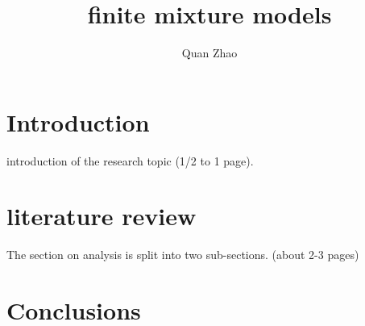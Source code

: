 \documentclass{article}
\begin{document}
\title{finite mixture models}

\author{Quan Zhao}

\maketitle



\section{Introduction}
introduction of the research topic
(1/2 to 1 page).

\section{literature review}
The section on analysis is split into two sub-sections. 
(about 2-3 pages)
\cite{mrc_paper}

\section{Conclusions}


\end{document}
